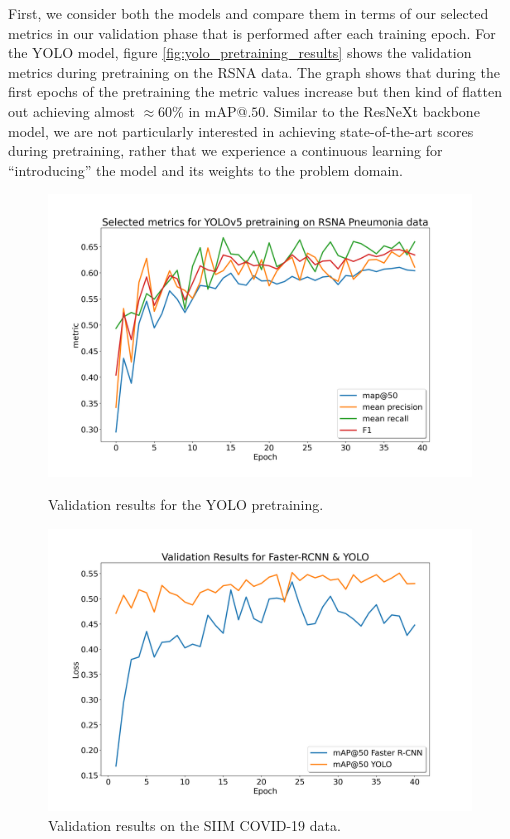 First, we consider both the models and compare them in terms of our selected metrics in our validation phase that is performed after each training epoch.
For the \ac{YOLO} model, figure \ref{fig:yolo_pretraining_results} shows the validation metrics during pretraining on the \ac{RSNA} data. The graph shows that during the first epochs of the pretraining the metric values increase but then kind of flatten out achieving almost $\approx60\%$ in \ac{mAP}@$.50$. Similar to the ResNeXt backbone model, we are not particularly interested in achieving state-of-the-art scores during pretraining, rather that we experience a continuous learning for \enquote{introducing} the model and its weights to the problem domain.
\begin{figure}[h!]
	\begin{minipage}[b]{.5\linewidth} %
		\includegraphics[width=\linewidth]{img/metrics_giou_pretrained_yolo_40.png}
		\caption{Validation results for the \ac{YOLO} pretraining.}
		\label{fig:yolo_pretraining_results}
	\end{minipage}
	\begin{minipage}[b]{.5\linewidth} %
		\includegraphics[width=\linewidth]{img/eval_results_ap_only_fasterrcnn_yolo.png}
		\caption{Validation results on the SIIM COVID-19 data.}
		\label{fig:yolo_frcnn_results}
	\end{minipage}
\end{figure}

